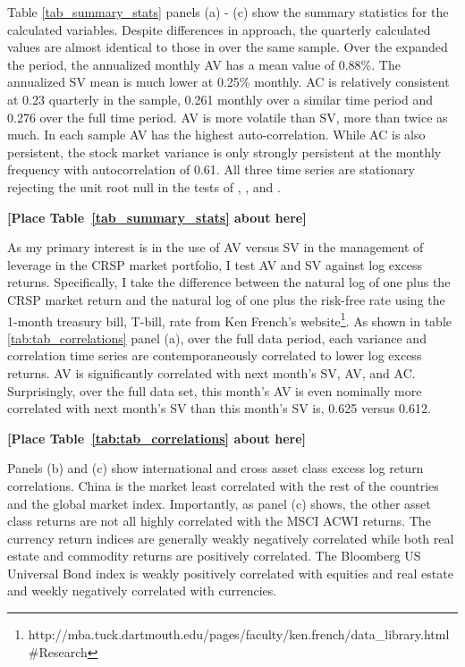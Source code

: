 Table \ref{tab_summary_stats} panels (a) - (c) show the summary statistics for the calculated variables. Despite differences in approach, the quarterly calculated values are almost identical to those in \citet{pollet_average_2010} over the same sample. Over the expanded the period, the annualized monthly AV has a mean value of 0.88\%. The annualized SV mean is much lower at 0.25\% monthly. AC is relatively consistent at 0.23 quarterly in the \cite{pollet_average_2010} sample, 0.261 monthly over a similar time period and 0.276 over the full time period. AV is more volatile than SV, more than twice as much. In each sample AV has the highest auto-correlation. While AC is also persistent, the stock market variance is only strongly persistent at the monthly frequency with autocorrelation of 0.61. All three time series are stationary rejecting the unit root null in the tests of \citet{dickey_distribution_1979}, \citet{Ng2001}, and \citet{ers1996}. 
\bigskip
\centerline{\bf [Place Table~\ref{tab_summary_stats} about here]}
\bigskip

As my primary interest is in the use of AV versus SV in the management of leverage in the CRSP market portfolio, I test AV and SV against log excess returns.
Specifically, I take the difference between the natural log of one plus the CRSP market return and the natural log of one plus the risk-free rate using %
the 1-month treasury bill, T-bill, rate from Ken French's website\footnote{http://mba.tuck.dartmouth.edu/pages/faculty/ken.french/data\_library.html\#Research}. As shown in table \ref{tab:tab_correlations} panel (a), over the full data period, each variance and correlation time series are contemporaneously correlated to lower log excess returns. AV is significantly correlated with next month's SV, AV, and AC. Surprisingly, over the full data set, this month's AV is even nominally more correlated with next month's SV than this month's SV is, 0.625 versus 0.612.%

\bigskip
\centerline{\bf [Place Table~\ref{tab:tab_correlations} about here]}
\bigskip

Panels (b) and (c) show international and cross asset class excess log return correlations. China is the market least correlated with the rest of the countries and the global market index. Importantly, as panel (c) shows, the other asset class returns are not all highly correlated with the MSCI ACWI returns. The currency return indices are generally weakly negatively correlated while both real estate and commodity returns are positively correlated. The Bloomberg US Universal Bond index is weakly positively correlated with equities and real estate and weekly negatively correlated with currencies.

